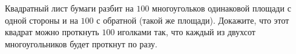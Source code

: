 Квадратный лист бумаги разбит на $100$ многоугольков одинаковой площади с одной стороны и на $100$ с
обратной (такой же площади). Докажите, что этот квадрат можно проткнуть $100$ иголками так, что каждый из
двухсот многоугольников будет проткнут по разу.
